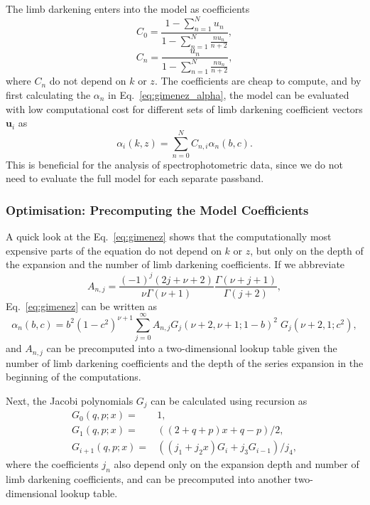 \documentclass[usenatbib,usegraphicx,useAMS]{mn2e}
\begin{document}
{The limb darkening enters into the \citeauthor{Gimenez2006} model as coefficients 
\begin{equation}
 C_0 = \frac{1-\sum_{n=1}^N u_n}{1-\sum_{n=1}^N \frac{n u_n}{n+2}},
\end{equation}
\begin{equation}
 C_n = \frac{u_n}{1-\sum_{n=1}^N \frac{n u_n}{n+2}},
\end{equation}
where $C_n$ do not depend on $k$ or $z$. The coefficients are cheap to compute, and by first calculating the $\alpha_n$ 
in Eq.~\ref{eq:gimenez_alpha}, the model can be evaluated with low computational cost for different sets of limb 
darkening coefficient vectors $\mathbf{u}_i$ as \begin{equation}
 \alpha_i(k,z) = \sum_{n=0}^N C_{n,i} \alpha_n(b,c). \label{eq:gimenez_alpha_multicolor}
\end{equation}
This is beneficial for the analysis of spectrophotometric data, since we do not need to evaluate the full model for each 
separate passband.


\subsubsection{Optimisation: Precomputing the Model Coefficients}
\label{sec:gimenez_optimisation}

A quick look at the Eq.~\ref{eq:gimenez} shows that the computationally most expensive parts of the equation do not 
depend on $k$ or $z$, but only on the depth of the expansion and the number of limb darkening coefficients. If we 
abbreviate \begin{equation}
 A_{n,j} = \frac{(-1)^j (2j+\nu+2)}{\nu \Gamma(\nu+1)} \frac{\Gamma(\nu+j+1)}{\Gamma(j+2)}, \label{eq:gimemez_a}
\end{equation}
Eq.~\ref{eq:gimenez} can be written as
\begin{equation}
 \alpha_n(b,c) = b^2 (1-c^2)^{\nu+1} \sum_{j=0}^\infty A_{n,j} G_j(\nu+2, \nu+1; 1-b)^2 \; G_j(\nu+2, 1; c^2),
\end{equation}
and $A_{n,j}$ can be precomputed into a two-dimensional lookup table given the number of limb darkening coefficients and 
the depth of the series expansion in the beginning of the computations. 

Next, the Jacobi polynomials $G_j$ can be calculated using recursion as
\begin{eqnarray}
 G_0(q,p;x) =& 1, \nonumber \\
 G_1(q,p;x) =& ( (2+q+p) x + q-p ) / 2, \\
 G_{i+1}(q,p;x) =& ( ( j_1 + j_2 x ) G_i + j_3 G_{i-1} ) / j_4, \nonumber
\end{eqnarray}
where the coefficients $j_n$ also depend only on the expansion depth and number of limb darkening coefficients, and can 
be precomputed into another two-dimensional lookup table.

}
\end{document}
